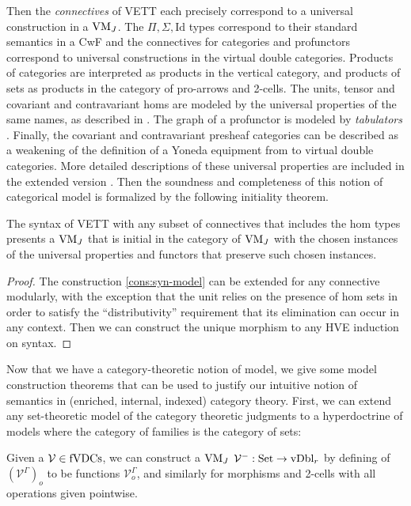 \documentclass{llncs}
\begin{document}
Then the \emph{connectives} of VETT each precisely correspond to a
universal construction in a $\textrm{VM}_J$. The $\Pi,\Sigma,\text{Id}$ types
correspond to their standard semantics in a CwF and the connectives
for categories and profunctors correspond to universal constructions
in the virtual double categories. Products of categories are
interpreted as products in the vertical category, and products of sets
as products in the category of pro-arrows and 2-cells. The units,
tensor and covariant and contravariant homs are modeled by the
universal properties of the same names, as described in
\citet{Shulman08}. The graph of a profunctor is modeled by
\emph{tabulators} \citet{grandis-pare99}. Finally, the covariant and
contravariant presheaf categories can be described as a weakening of
the definition of a Yoneda equipment from \citet{diliberti-loregian}
to virtual double categories. More detailed descriptions of these
universal properties are included in the extended version
\cite{extended-version}.
%
Then the soundness and completeness of this notion of categorical
model is formalized by the following initiality theorem.
\begin{theorem}[Initiality]
  The syntax of VETT with any subset of connectives that includes the
  hom types presents a $\textrm{VM}_J$ that is initial in the category of
  $\textrm{VM}_J$ with the chosen instances of the universal properties and
  functors that preserve such chosen instances.
\end{theorem}
\begin{proof}
  The construction \ref{cons:syn-model} can be extended for any
  connective modularly, with the exception that the unit relies on the
  presence of hom sets in order to satisfy the ``distributivity''
  requirement that its elimination can occur in any context. Then we
  can construct the unique morphism to any HVE induction on syntax.
\end{proof}


Now that we have a category-theoretic notion of model, we give some
model construction theorems that can be used to justify our intuitive
notion of semantics in (enriched, internal, indexed) category theory.
%
First, we can extend any set-theoretic model of the category theoretic
judgments to a hyperdoctrine of models where the category of families
is the category of sets:
\begin{construction}
  Given a $\mathcal V \in \textrm{fVDCs}$, we can construct a $\textrm{VM}_J$ $\mathcal
  V^{-}: \textrm{Set} \to \text{vDbl}_r$ by defining of $(\mathcal
  V^\Gamma)_o$ to be functions $\mathcal V_o^\Gamma$, and similarly
  for morphisms and 2-cells with all operations given pointwise.
\end{construction}
\end{document}
